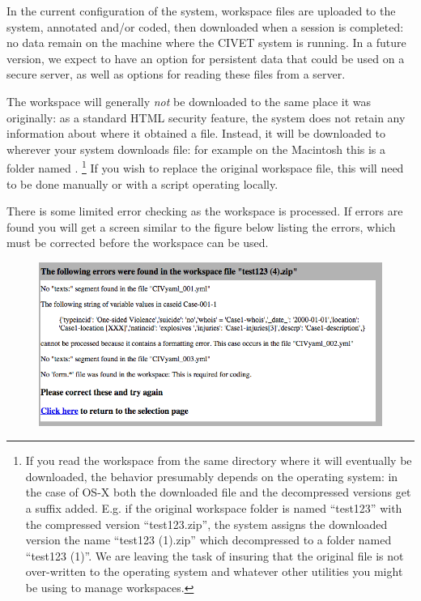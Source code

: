 \documentclass[letterpaper,10pt,english]{sphinxmanual}
\begin{document}
In the current configuration of the system, workspace files are uploaded
to the system, annotated and/or coded, then downloaded when a session is
completed: no data remain on the machine where the CIVET system is
running. In a future version, we expect to have an option for persistent
data that could be used on a secure server, as well as options for
reading these files from a server.

The workspace will generally \emph{not} be downloaded to the same place it
was originally: as a standard HTML security feature, the system does not
retain any information about where it obtained a file. Instead, it will
be downloaded to wherever your system downloads file: for example on the
Macintosh this is a folder named . \footnote{
If you read the workspace from the same directory where it will
eventually be downloaded, the behavior presumably depends on the
operating system: in the case of OS-X both the downloaded
file and the decompressed versions get a suffix added. E.g. if the
original workspace folder is named “test123” with the compressed
version “test123.zip”, the system assigns the downloaded version
the name “test123 (1).zip” which decompressed to a folder named
“test123 (1)”. We are leaving the task of insuring that the
original file is not over-written to the operating system and
whatever other utilities you might be using to manage workspaces.
} If you wish to
replace the original workspace file, this will need to be done manually
or with a script operating locally.

There is some limited error checking as the workspace is processed. If
errors are found you will get a screen similar to the figure
below listing the errors, which must be corrected before the
workspace can be used.
\begin{figure}[htbp]
\centering

\includegraphics{workspace_errors.png}
\end{figure}
\end{document}
